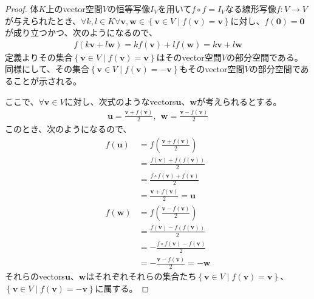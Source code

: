 \documentclass[dvipdfmx]{jsarticle}
\begin{document}
\begin{proof}
体$K$上のvector空間$V$の恒等写像$I_{V}$を用いて$f \circ f = I_{V}$なる線形写像$f:V \rightarrow V$が与えられたとき、$\forall k,l \in K\forall\mathbf{v},\mathbf{w} \in \left\{ \mathbf{v} \in V \middle| f\left( \mathbf{v} \right) = \mathbf{v} \right\}$に対し、$f\left( \mathbf{0} \right) = \mathbf{0}$が成り立つかつ、次のようになるので、
\begin{align*}
f\left( k\mathbf{v} + l\mathbf{w} \right) = kf\left( \mathbf{v} \right) + lf\left( \mathbf{w} \right) = k\mathbf{v} + l\mathbf{w}
\end{align*}
定義よりその集合$\left\{ \mathbf{v} \in V \middle| f\left( \mathbf{v} \right) = \mathbf{v} \right\}$はそのvector空間$V$の部分空間である。同様にして、その集合$\left\{ \mathbf{v} \in V \middle| f\left( \mathbf{v} \right) = - \mathbf{v} \right\}$もそのvector空間$V$の部分空間であることが示される。\par
ここで、$\forall\mathbf{v} \in V$に対し、次式のようなvectors$\mathbf{u}$、$\mathbf{w}$が考えられるとする。
\begin{align*}
\mathbf{u} = \frac{\mathbf{v} + f\left( \mathbf{v} \right)}{2},\ \ \mathbf{w} = \frac{\mathbf{v} - f\left( \mathbf{v} \right)}{2}
\end{align*}
このとき、次のようになるので、
\begin{align*}
f\left( \mathbf{u} \right) &= f\left( \frac{\mathbf{v} + f\left( \mathbf{v} \right)}{2} \right)\\
&= \frac{f\left( \mathbf{v} \right) + f\left( f\left( \mathbf{v} \right) \right)}{2}\\
&= \frac{f \circ f\left( \mathbf{v} \right) + f\left( \mathbf{v} \right)}{2}\\
&= \frac{\mathbf{v} + f\left( \mathbf{v} \right)}{2} = \mathbf{u}\\
f\left( \mathbf{w} \right) &= f\left( \frac{\mathbf{v} - f\left( \mathbf{v} \right)}{2} \right)\\
&= \frac{f\left( \mathbf{v} \right) - f\left( f\left( \mathbf{v} \right) \right)}{2}\\
&= - \frac{f \circ f\left( \mathbf{v} \right) - f\left( \mathbf{v} \right)}{2}\\
&= - \frac{\mathbf{v} - f\left( \mathbf{v} \right)}{2} = - \mathbf{w}
\end{align*}
それらのvectors$\mathbf{u}$、$\mathbf{w}$はそれぞれそれらの集合たち$\left\{ \mathbf{v} \in V \middle| f\left( \mathbf{v} \right) = \mathbf{v} \right\}$、$\left\{ \mathbf{v} \in V \middle| f\left( \mathbf{v} \right) = - \mathbf{v} \right\}$に属する。\par

\end{proof}
\end{document}
